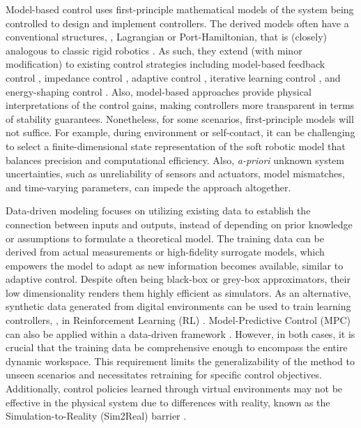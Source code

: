 Model-based control uses first-principle mathematical models of the system being controlled to design and implement controllers. The derived models often have a conventional structures, \eg, Lagrangian or Port-Hamiltonian, that is (closely) analogous to classic rigid robotics \cite{Spong2006,Murray1994,Armanini2023,DellaSantina2021}. As such, they extend (with minor modification) to existing control strategies including model-based feedback control \cite{Falkenhahn2015,Milana2021}, impedance control \cite{DellaSantina2020}, adaptive control \cite{Trumic2020,Kazemipour2022May}, iterative learning control \cite{Hofer2019}, and energy-shaping control \cite{Franco2020,Franco2022,Chang2023,Borja2022Apr}. Also, model-based approaches provide physical interpretations of the control gains, making controllers more transparent in terms of stability guarantees. Nonetheless, for some scenarios, first-principle models will not suffice. For example, during  environment or self-contact, it can be challenging to select a finite-dimensional state representation of the soft robotic model that balances precision and computational efficiency. Also, \textit{a-priori} unknown system uncertainties, such as unreliability of sensors and actuators, model mismatches, and time-varying parameters, can impede the approach altogether.

\par Data-driven modeling focuses on utilizing existing data to establish the connection between inputs and outputs, instead of depending on prior knowledge or assumptions to formulate a theoretical model. The training data can be derived from actual measurements or high-fidelity surrogate models, which empowers the model to adapt as new information becomes available, similar to adaptive control. Despite often being black-box or grey-box approximators, their low dimensionality renders them highly efficient as simulators. As an alternative, synthetic data generated from digital environments can be used to train learning controllers, \eg, in Reinforcement Learning (RL) \cite{Schegg2022,Tekinalp2022}. Model-Predictive Control (MPC) can also be applied within a data-driven framework \cite{Hyatt2020,Bruder2019}. However, in both cases, it is crucial that the training data be comprehensive enough to encompass the entire dynamic workspace. This requirement limits the generalizability of the method to unseen scenarios and necessitates retraining for specific control objectives. Additionally, control policies learned through virtual environments may not be effective in the physical system due to differences with reality, known as the Simulation-to-Reality (Sim2Real) barrier \cite{Kriegman2020}.

